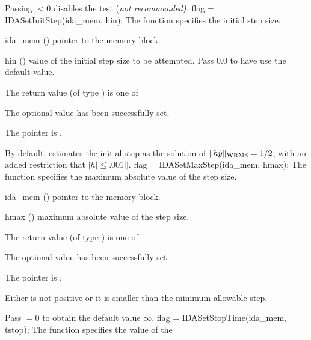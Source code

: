 {{  Passing  $< 0$ disables the test (\it{not recommended}).
}
{
flag = IDASetInitStep(ida\_mem, hin);
}
{
  The function  specifies the initial step size.
}
{
  \begin{args}
  \item[ida\_mem] ()
    pointer to the {\idas} memory block.
  \item[hin] ()
    value of the initial step size to be attempted.
    Pass $0.0$ to have {\idas} use the default value.
  \end{args}
}
{
  The return value  (of type ) is one of
  \begin{args}
  \item[\Id{IDA\_SUCCESS}] 
    The optional value has been successfully set.
  \item[\Id{IDA\_MEM\_NULL}]
    The  pointer is .
  \end{args}
}
{
  By default, {\idas} estimates the initial step as the solution of 
  $\|h \dot{y} \|_{\mbox{\scriptsize WRMS}} = 1/2$, with an added restriction
  that $|h| \leq .001|$$|$.
}
{
flag = IDASetMaxStep(ida\_mem, hmax);
}
{
  The function  specifies the maximum absolute
  value of the step size.
}
{
  \begin{args}
  \item[ida\_mem] ()
    pointer to the {\idas} memory block.
  \item[hmax] ()
    maximum absolute value of the step size.
  \end{args}
}
{
  The return value  (of type ) is one of
  \begin{args}
  \item[\Id{IDA\_SUCCESS}] 
    The optional value has been successfully set.
  \item[\Id{IDA\_MEM\_NULL}]
    The  pointer is .
  \item[\Id{IDA\_ILL\_INPUT}]
    Either  is not positive or it is smaller than the minimum allowable
    step.
  \end{args}
}
{
  Pass $=0$ to obtain the default value $\infty$.
}
{
flag = IDASetStopTime(ida\_mem, tstop);
}
{
  The function  specifies the value of the
}}
